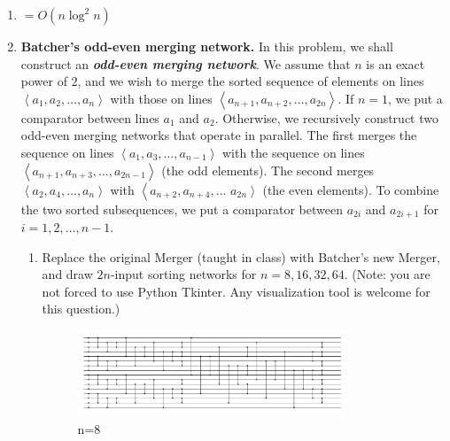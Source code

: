 \documentclass[12pt,a4paper]{article}
\makeatletter
\newtheorem*{solution}{Solution}
\theoremstyle{definition}
\renewenvironment{solution}[1][Solution] {\par\pushQED{\qed}\normalfont\topsep6\p@\@plus6\p@\relax\trivlist\item[\hskip\labelsep\bfseries#1\@addpunct{.}]\ignorespaces}{\popQED\endtrivlist\@endpefalse} \makeatother
\makeatother
\begin{document}
\begin{enumerate}
\begin{solution}
    	$=O(n\log^2n)$
    \end{solution}
    \item
    \textbf{Batcher's odd-even merging network.} In this problem, we shall construct an \textbf{\textit{odd-even merging network}}. We assume that $n$ is an exact power of $2$, and we wish to merge the sorted sequence of elements on lines $\left\langle a_{1}, a_{2}, \ldots, a_{n}\right\rangle$ with those on lines $\left\langle a_{n+1}, a_{n+2}, \ldots, a_{2n}\right\rangle .$ If $n=1$, we put a comparator between lines $a_{1}$ and $a_{2}$. Otherwise, we recursively construct two odd-even merging networks that operate in parallel. The first merges the sequence on lines $\left\langle a_{1}, a_{3}, \ldots, a_{n-1}\right\rangle$ with the sequence on lines $\left\langle a_{n+1}, a_{n+3}, \ldots, a_{2n-1}\right\rangle$ (the
    odd elements). The second merges $\left\langle a_{2}, a_{4}, \ldots, a_{n}\right\rangle$ with $\left\langle a_{n+2}, a_{n+4}, \ldots\right.$
    $\left.a_{2n}\right\rangle$ (the even elements). To combine the two sorted subsequences, we put a comparator between $a_{2i}$ and $a_{2i+1}$ for $i=1,2, \ldots, n-1$.
    \begin{enumerate}
    	\item Replace the original Merger (taught in class) with Batcher's new Merger, and draw $2n$-input sorting networks for $n=8, 16, 32, 64$. {\color{blue}(Note: you are not forced to use Python Tkinter. Any visualization tool is welcome for this question.)}	
    	
    		\begin{figure}[htbp]
    			\centering
    			\includegraphics[width=0.8\textwidth]{n8.png}
    			\caption{n=8}\label{n8}
    		\end{figure}
    	    

\end{enumerate}
\end{enumerate}
\end{document}
